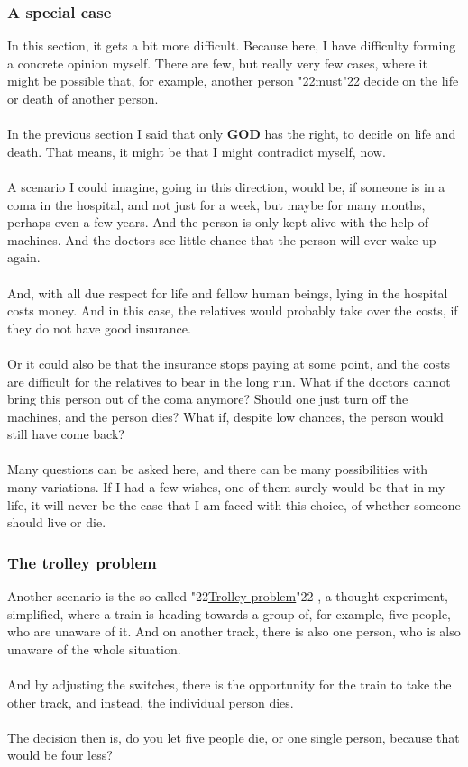 \documentclass[12pt,a5paper]{article}
\newcommand{\God}[0]{\textbf{GOD}}
\newcommand{\q}[1]{\char"22{#1}\char"22 }
\begin{document}
	\subsubsection{A special case}
		In this section,
		it gets a bit more difficult.
		Because here,
		I have difficulty forming a concrete opinion myself.
		There are few,
		but really very few cases,
		where it might be possible that,
		for example,
		another person \q{must} decide on the life or death of another person.
		\\
		\\
		In the previous section I said that only {\God} has the right,
		to decide on life and death.
		That means,
		it might be that I might contradict myself,
		now.
		\\
		\\
		A scenario I could imagine,
		going in this direction,
		would be,
		if someone is in a coma in the hospital,
		and not just for a week,
		but maybe for many months,
		perhaps even a few years.
		And the person is only kept alive with the help of machines.
		And the doctors see little chance that the person will ever wake up again.
		\\
		\\
		And,
		with all due respect for life and fellow human beings,
		lying in the hospital costs money.
		And in this case,
		the relatives would probably take over the costs,
		if they do not have good insurance.
		\\
		\\
		Or it could also be that the insurance stops paying at some point,
		and the costs are difficult for the relatives to bear in the long run.
		What if the doctors cannot bring this person out of the coma anymore?
		Should one just turn off the machines,
		and the person dies?
		What if,
		despite low chances,
		the person would still have come back?
		\\
		\\
		Many questions can be asked here,
		and there can be many possibilities with many variations.
		If I had a few wishes,
		one of them surely would be that in my life,
		it will never be the case that I am faced with this choice,
		of whether someone should live or die.
		
	\subsubsection{The trolley problem}
		Another scenario is the so-called \q{\href{https://en.wikipedia.org/wiki/Trolley_problem}{Trolley problem}},
		a thought experiment,
		simplified,
		where a train is heading towards a group of,
		for example,
		five people,
		who are unaware of it.
		And on another track,
		there is also one person,
		who is also unaware of the whole situation.
		\\
		\\
		And by adjusting the switches,
		there is the opportunity for the train to take the other track,
		and instead,
		the individual person dies.
		\\
		\\
		The decision then is,
		do you let five people die,
		or one single person,
		because that would be four less?
		
\end{document}

